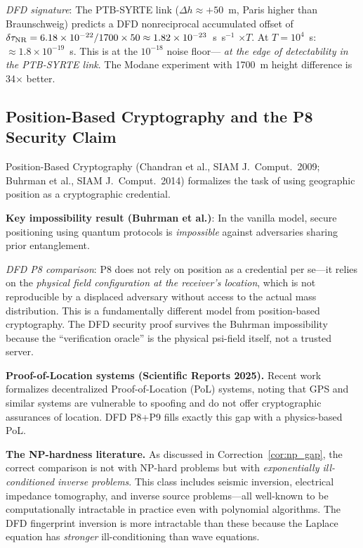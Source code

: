 \documentclass[aps,prd,twocolumn,superscriptaddress,nofootinbib]{revtex4-2}
\begin{document}
\textit{DFD signature}: The PTB-SYRTE link ($\Delta h \approx +50$~m,
Paris higher than Braunschweig) predicts a DFD nonreciprocal accumulated
offset of $\delta\tau_{\rm NR} = 6.18\times 10^{-22}/1700\times 50
\approx 1.82\times 10^{-23}$~s~s$^{-1}$ $\times T$.  At $T = 10^4$~s:
$\approx 1.8\times 10^{-19}$~s.  This is at the $10^{-18}$ noise floor---
\emph{at the edge of detectability in the PTB-SYRTE link}.  The Modane
experiment with 1700~m height difference is 34$\times$ better.

\subsection{Position-Based Cryptography and the P8 Security Claim}

Position-Based Cryptography (Chandran et al., SIAM J.\ Comput.\ 2009;
Buhrman et al., SIAM J.\ Comput.\ 2014) formalizes the task of using
geographic position as a cryptographic credential.

\textbf{Key impossibility result (Buhrman et al.)}: In the vanilla model,
secure positioning using quantum protocols is \emph{impossible} against
adversaries sharing prior entanglement.

\textit{DFD P8 comparison}: P8 does not rely on position as a credential
per se---it relies on the \emph{physical field configuration at the
receiver's location}, which is not reproducible by a displaced adversary
without access to the actual mass distribution.  This is a fundamentally
different model from position-based cryptography.  The DFD security proof
survives the Buhrman impossibility because the ``verification oracle'' is
the physical psi-field itself, not a trusted server.

\textbf{Proof-of-Location systems (Scientific Reports 2025).}
Recent work formalizes decentralized Proof-of-Location (PoL) systems,
noting that GPS and similar systems are vulnerable to spoofing and do not
offer cryptographic assurances of location.  DFD P8+P9 fills exactly this
gap with a physics-based PoL.

\textbf{The NP-hardness literature.}  As discussed in Correction~\ref{cor:np_gap},
the correct comparison is not with NP-hard problems but with \emph{exponentially
ill-conditioned inverse problems}.  This class includes seismic inversion,
electrical impedance tomography, and inverse source problems---all well-known
to be computationally intractable in practice even with polynomial algorithms.
The DFD fingerprint inversion is more intractable than these because the
Laplace equation has \emph{stronger} ill-conditioning than wave equations.
\end{document}
